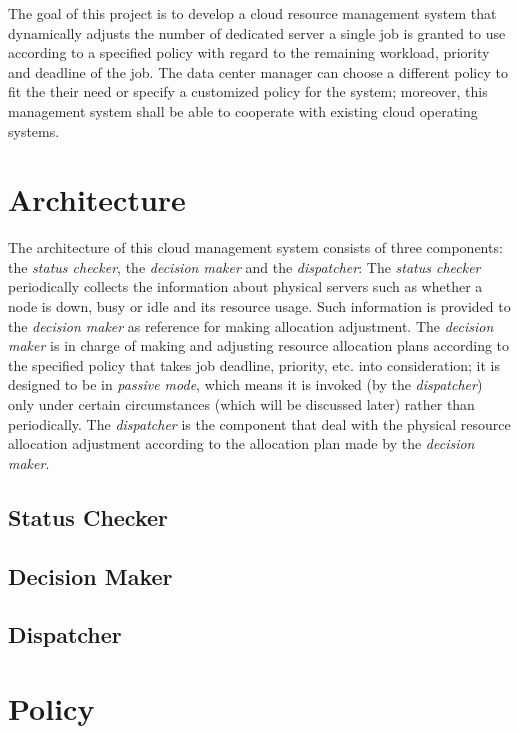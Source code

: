 \documentclass[11pt]{article}
\begin{document}
The goal of this project is to develop a cloud resource management
system that dynamically adjusts the number of dedicated server a single
job is granted to use according to a specified policy with regard to the
remaining workload, priority and deadline of the job. The data center
manager can choose a different policy to fit the their need or specify a
customized policy for the system; moreover, this management system shall
be able to cooperate with existing cloud operating systems.


\section{Architecture}


The architecture of this cloud management system consists of three
components: the \emph{status checker}, the \emph{decision maker} and the
\emph{dispatcher}:  The \emph{status checker} periodically collects the
information about physical servers such as whether a node is down, busy
or idle and its resource usage.  Such information is provided to the
\emph{decision maker} as reference for making allocation adjustment.
The \emph{decision maker} is in charge of making and adjusting resource
allocation plans according to the specified policy that takes job
deadline, priority, etc. into consideration; it is designed to be in
\emph{passive mode}, which means it is invoked (by the
\emph{dispatcher}) only under certain circumstances (which will be
discussed later) rather than periodically.  The \emph{dispatcher} is the
component that deal with the physical resource allocation adjustment
according to the allocation plan made by the \emph{decision maker}.

\subsection{Status Checker}

\subsection{Decision Maker}

\subsection{Dispatcher}

\section{Policy}

\renewcommand\refname{Reference}


\end{document}
